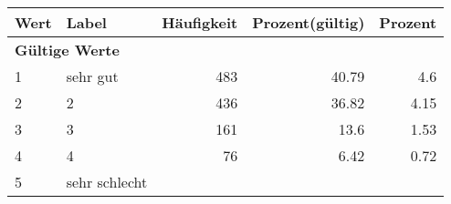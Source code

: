      \begin{longtable}{lXrrr}
     \toprule
     \textbf{Wert} & \textbf{Label} & \textbf{Häufigkeit} & \textbf{Prozent(gültig)} & \textbf{Prozent} \\
     \endhead
     \midrule
     \multicolumn{5}{l}{\textbf{Gültige Werte}}\\

     1 &
     \multicolumn{1}{X}{ sehr gut   } &


       \num{483} &
       \num[round-mode=places,round-precision=2]{40,79} &
         \num[round-mode=places,round-precision=2]{4,6} \\

     2 &
     \multicolumn{1}{X}{ 2   } &


       \num{436} &
       \num[round-mode=places,round-precision=2]{36,82} &
         \num[round-mode=places,round-precision=2]{4,15} \\

     3 &
     \multicolumn{1}{X}{ 3   } &


       \num{161} &
       \num[round-mode=places,round-precision=2]{13,6} &
         \num[round-mode=places,round-precision=2]{1,53} \\

     4 &
     \multicolumn{1}{X}{ 4   } &


       \num{76} &
       \num[round-mode=places,round-precision=2]{6,42} &
         \num[round-mode=places,round-precision=2]{0,72} \\

     5 &
     \multicolumn{1}{X}{ sehr schlecht   } &



\end{longtable}
